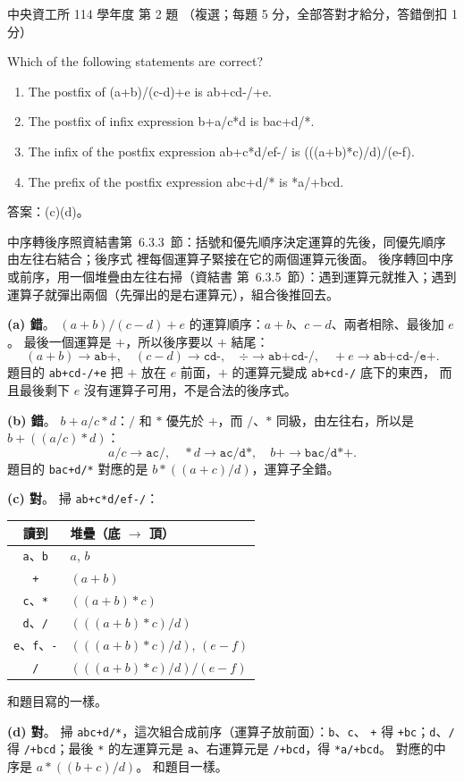 \begin{pastexam}[label={px:ncu-114-dsa-02}]{中央資工所 114 學年度 第 2 題}
（複選；每題 5 分，全部答對才給分，答錯倒扣 1 分）

Which of the following statements are correct?
\begin{enumerate}[label=(\alph*)]
\item The postfix of (a+b)/(c-d)+e is ab+cd-/+e.
\item The postfix of infix expression b+a/c*d is bac+d/*.
\item The infix of the postfix expression ab+c*d/ef-/ is (((a+b)*c)/d)/(e-f).
\item The prefix of the postfix expression abc+d/* is *a/+bcd.
\end{enumerate}
\end{pastexam}

\begin{pastsoln}
答案：(c)(d)。

中序轉後序照資結書第~6.3.3~節：括號和優先順序決定運算的先後，同優先順序由左往右結合；後序式
裡每個運算子緊接在它的兩個運算元後面。 後序轉回中序或前序，用一個堆疊由左往右掃（資結書
第~6.3.5~節）：遇到運算元就推入；遇到運算子就彈出兩個（先彈出的是右運算元），組合後推回去。

\textbf{(a) 錯}。 $(a+b)/(c-d)+e$ 的運算順序：$a+b$、$c-d$、兩者相除、最後加 $e$。 最後一個運算是
$+$，所以後序要以 $+$ 結尾：
\[
(a+b) \to \texttt{ab+},\quad (c-d) \to \texttt{cd-},\quad \div \to \texttt{ab+cd-/},\quad
+e \to \texttt{ab+cd-/e+}.
\]
題目的 \texttt{ab+cd-/+e} 把 $+$ 放在 $e$ 前面，$+$ 的運算元變成 \texttt{ab+cd-/} 底下的東西，
而且最後剩下 $e$ 沒有運算子可用，不是合法的後序式。

\textbf{(b) 錯}。 $b+a/c*d$：$/$ 和 $*$ 優先於 $+$，而 $/$、$*$ 同級，由左往右，所以是
$b + ((a/c)*d)$：
\[
a/c \to \texttt{ac/},\quad *d \to \texttt{ac/d*},\quad b+ \to \texttt{bac/d*+}.
\]
題目的 \texttt{bac+d/*} 對應的是 $b*((a+c)/d)$，運算子全錯。

\textbf{(c) 對}。 掃 \texttt{ab+c*d/ef-/}：
\begin{center}
\small
\begin{tabular}{cl}
\toprule
讀到 & 堆疊（底 $\to$ 頂） \\
\midrule
\texttt{a}、\texttt{b} & $a$, $b$ \\
\texttt{+} & $(a+b)$ \\
\texttt{c}、\texttt{*} & $((a+b)*c)$ \\
\texttt{d}、\texttt{/} & $(((a+b)*c)/d)$ \\
\texttt{e}、\texttt{f}、\texttt{-} & $(((a+b)*c)/d)$, $(e-f)$ \\
\texttt{/} & $(((a+b)*c)/d)/(e-f)$ \\
\bottomrule
\end{tabular}
\end{center}
和題目寫的一樣。

\textbf{(d) 對}。 掃 \texttt{abc+d/*}，這次組合成前序（運算子放前面）：\texttt{b}、\texttt{c}、
\texttt{+} 得 \texttt{+bc}；\texttt{d}、\texttt{/} 得 \texttt{/+bcd}；最後 \texttt{*} 的左運算元是
\texttt{a}、右運算元是 \texttt{/+bcd}，得 \texttt{*a/+bcd}。 對應的中序是 $a*((b+c)/d)$。 和題目一樣。
\end{pastsoln}
